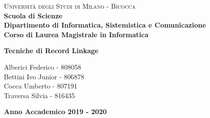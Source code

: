 \documentclass[a4paper,12pt]{article}
\renewcommand{\baselinestretch}{1.5}
\begin{document}
\begin{titlepage}
\noindent
    \vspace*{5mm}
	\begin{minipage}[t]{0.15\textwidth}
	    \vspace*{5mm}
	\end{minipage}
	\hspace{1cm}
	\begin{minipage}[t]{0.9\textwidth}
	      \vspace*{5mm}
		{
			{\textsc{Università degli Studi di Milano - Bicocca} } \\
			\textbf{Scuola di Scienze} \\
			\textbf{Dipartimento di Informatica, Sistemistica e Comunicazione} \\
			\textbf{Corso di Laurea Magistrale in Informatica} \\
			\par
		}
	\end{minipage}
	
	\vspace{42mm}

\begin{center}
    {\LARGE{
            \textbf{
            	Tecniche di Record Linkage \\ }
    }}        
\end{center}

\vspace{40mm}
	
	
	\begin{flushright}
		\large{Alberici Federico - 808058\\} 
		\large{Bettini Ivo Junior - 806878\\} 
		\large{Cocca Umberto - 807191\\} 
		\large{Traversa Silvia - 816435} 
	\end{flushright}
	
	\vspace{15mm}
	\begin{center}
		{\large{\bf Anno Accademico 2019 - 2020}}
	\end{center}


\renewcommand{\baselinestretch}{1.5}

\end{titlepage}
\end{document}
